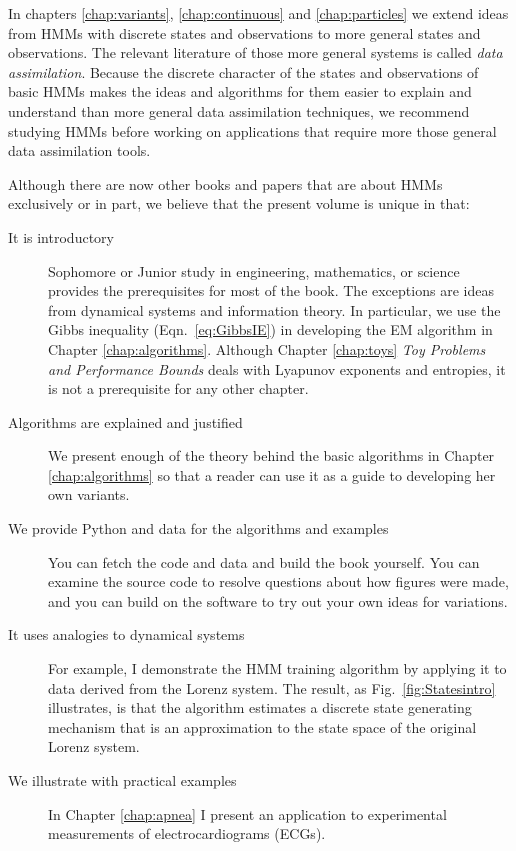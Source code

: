 \documentclass[ltxbook,showlabels, commentsvisible]{hmmdsbook}
\begin{document}
In chapters \ref{chap:variants}, \ref{chap:continuous} and
\ref{chap:particles} we extend ideas from HMMs with discrete states and
observations to more general states and observations.  The relevant
literature of those more general systems is called \emph{data
  assimilation}.  Because the discrete character of the states and
observations of basic HMMs makes the ideas and algorithms for them
easier to explain and understand than more general data assimilation
techniques, we recommend studying HMMs before working on applications
that require more those general data assimilation tools.

Although there are now other books and papers that are about HMMs
exclusively or in part, we believe that the present volume is unique in
that:
\begin{description}
\item[It is introductory] Sophomore or Junior study in engineering,
  mathematics, or science provides the prerequisites for most of the
  book.  The exceptions are ideas from dynamical systems and
  information theory.  In particular, we use the Gibbs inequality
  (Eqn.~\eqref{eq:GibbsIE}) in developing the EM algorithm in Chapter
  \ref{chap:algorithms}.  Although Chapter \ref{chap:toys} \emph{Toy
    Problems and Performance Bounds} deals with Lyapunov exponents and
  entropies, it is not a prerequisite for any other chapter.
\item[Algorithms are explained and justified] We present enough of the
  theory behind the basic algorithms in Chapter \ref{chap:algorithms}
  so that a reader can use it as a guide to developing her own
  variants.
\item[We provide Python and data for the algorithms and examples] You
  can fetch the code and data and build the book yourself.  You can
  examine the source code to resolve questions about how figures were
  made, and you can build on the software to try out your own ideas
  for variations.
\item[It uses analogies to dynamical systems] For example, I
  demonstrate the HMM training algorithm by applying it to data
  derived from the Lorenz system.  The result, as
  Fig.~\ref{fig:Statesintro} illustrates, is that the algorithm
  estimates a discrete state generating mechanism that is an
  approximation to the state space of the original Lorenz system.
\item[We illustrate with practical examples] In Chapter
  \ref{chap:apnea} I present an application to experimental
  measurements of electrocardiograms (ECGs).  
\end{description}
\end{document}
